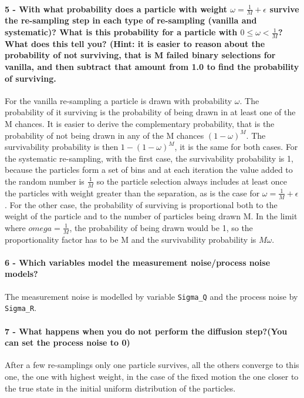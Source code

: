 \documentclass[12pt]{article}
\begin{document}
\paragraph{5 - With what probability does a particle with weight \(\omega=\frac{1}{M}+\epsilon\) survive the re-sampling step in each type of re-sampling (vanilla and systematic)? What is this probability for a particle with \(0\leq \omega < \frac{1}{M} \)? What does this tell you? (Hint: it is easier to reason about the probability
of not surviving, that is M failed binary selections for vanilla, and then subtract that amount from 1.0 to find the probability of surviving. } For the vanilla re-sampling a particle is drawn with probability \(\omega\). The probability of it surviving is the probability of being drawn in at least one of the M chances. It is easier to derive the complementary probability, that is the probability of not being drawn in any of the M chances \((1-\omega)^M\). The survivability probability is then \(1-(1-\omega)^M\), it is the same for both cases. For the systematic re-sampling, with the first case, the survivability probability is 1, because the particles form a set of bins and at each iteration the value added to the random number is \(\frac{1}{M}\) so the particle selection always includes at least once the particles with weight greater than the separation, as is the case for \(\omega = \frac{1}{M}+\epsilon\). For the other case, the probability of surviving is proportional both to the weight of the particle and to the number of particles being drawn M. In the limit where \(omega=\frac{1}{M}\), the probability of being drawn would be 1, so the proportionality factor has to be M and the survivability probability is \(M\omega\).

\paragraph{6 - Which variables model the measurement noise/process noise models?}
The measurement noise is modelled by variable \texttt{Sigma\_Q} and the process noise by \texttt{Sigma\_R}.

\paragraph{7 - What happens when you do not perform the diffusion step?(You can set the process noise to 0)} After a few re-samplings only one particle survives, all the others converge to this one, the one with highest weight, in the case of the fixed motion the one closer to the true state in the initial uniform distribution of the particles.
\end{document}
